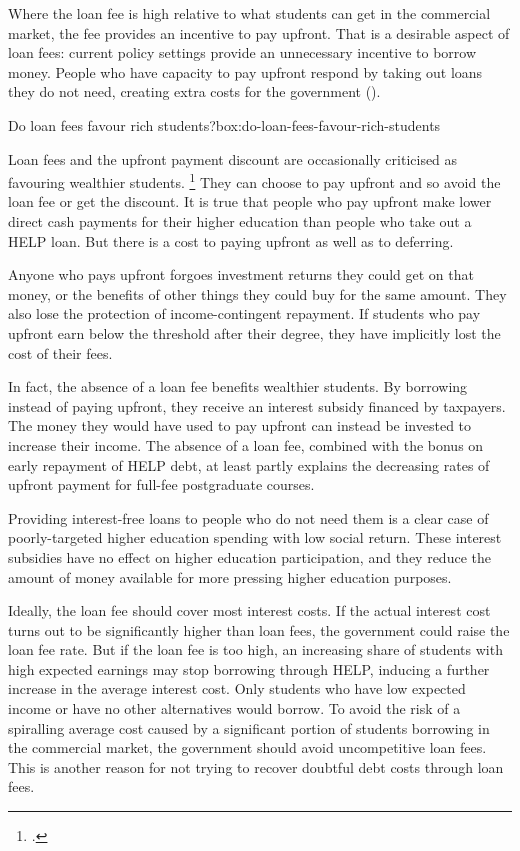 \documentclass[embargoed]{grattan}
\begin{document}
Where the loan fee is high relative to what students can get in the commercial market, the fee provides an incentive to pay upfront.
That is a desirable aspect of loan fees: current policy settings provide an unnecessary incentive to borrow money.
People who have capacity to pay upfront respond by taking out loans they do not need, creating extra costs for the government ().

\begin{smallbox}{Do loan fees favour rich students?}{box:do-loan-fees-favour-rich-students}

Loan fees and the upfront payment discount are occasionally criticised as favouring wealthier students.%
\footcites{Hare-2015-loan-fees-advantage-the-rich}{Evans2011MediareleaseGillard} %
They can choose to pay upfront and so avoid the loan fee or get the discount.
It is true that people who pay upfront make lower direct cash payments for their higher education than people who take out a \gls{HELP} loan.
But there is a cost to paying upfront as well as to deferring.

Anyone who pays upfront forgoes investment returns they could get on that money, or the benefits of other things they could buy for the same amount.
They also lose the protection of income-contingent repayment.
If students who pay upfront earn below the threshold after their degree, they have implicitly lost the cost of their fees.

In fact, the absence of a loan fee benefits wealthier students.
By borrowing instead of paying upfront, they receive an interest subsidy financed by taxpayers.
The money they would have used to pay upfront can instead be invested to increase their income.
The absence of a loan fee, combined with the bonus on early repayment of \gls{HELP} debt, at least partly explains the decreasing rates of upfront payment for full-fee postgraduate courses.

Providing interest-free loans to people who do not need them is a clear case of poorly-targeted higher education spending with low social return.
These interest subsidies have no effect on higher education participation, and they reduce the amount of money available for more pressing higher education purposes.
\end{smallbox}

Ideally, the loan fee should cover most interest costs.
If the actual interest cost turns out to be significantly higher than loan fees, the government could raise the loan fee rate.
But if the loan fee is too high, an increasing share of students with high expected earnings may stop borrowing through \gls{HELP}, inducing a further increase in the average interest cost.
Only students who have low expected income or have no other alternatives would borrow.
To avoid the risk of a spiralling average cost caused by a significant portion of students borrowing in the commercial market, the government should avoid uncompetitive loan fees.
This is another reason for not trying to recover doubtful debt costs through loan fees.
\end{document}
